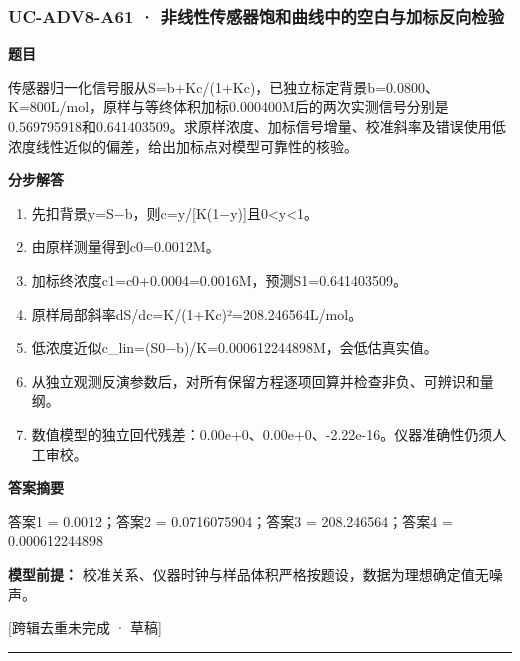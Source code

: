 \documentclass[UTF8,11pt,a4paper]{ctexart}
\begin{document}
\subsubsection*{UC-ADV8-A61 · 非线性传感器饱和曲线中的空白与加标反向检验}
\noindent\textbf{题目}\par
传感器归一化信号服从S=b+Kc/(1+Kc)，已独立标定背景b=0.0800、K=800L/mol，原样与等终体积加标0.000400M后的两次实测信号分别是0.569795918和0.641403509。求原样浓度、加标信号增量、校准斜率及错误使用低浓度线性近似的偏差，给出加标点对模型可靠性的核验。\par
\medskip\noindent\textbf{分步解答}
\begin{enumerate}
\item 先扣背景y=S−b，则c=y/[K(1−y)]且0<y<1。
\item 由原样测量得到c0=0.0012M。
\item 加标终浓度c1=c0+0.0004=0.0016M，预测S1=0.641403509。
\item 原样局部斜率dS/dc=K/(1+Kc)²=208.246564L/mol。
\item 低浓度近似c\_lin=(S0−b)/K=0.000612244898M，会低估真实值。
\item 从独立观测反演参数后，对所有保留方程逐项回算并检查非负、可辨识和量纲。
\item 数值模型的独立回代残差：0.00e+0、0.00e+0、-2.22e-16。仪器准确性仍须人工审校。
\end{enumerate}
\noindent\textbf{答案摘要}\par
答案1 = 0.0012；答案2 = 0.0716075904；答案3 = 208.246564；答案4 = 0.000612244898\par
\noindent\textbf{模型前提：}
校准关系、仪器时钟与样品体积严格按题设，数据为理想确定值无噪声。\par
\noindent\textcolor{red!65!black}{[跨辑去重未完成 · 草稿]} \par
\medskip\hrule\medskip
{}
\end{document}
